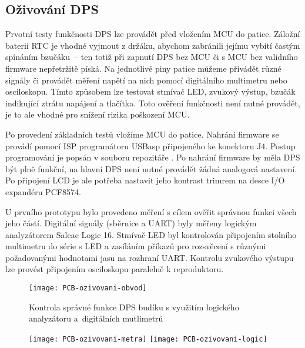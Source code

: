 \subsection{Oživování DPS}
Prvotní testy funkčnosti DPS lze provádět před vložením MCU do patice. Záložní
baterii RTC je vhodné vyjmout z držáku, abychom zabránili jejímu vybití častým
spínáním bzučáku~-- ten totiž při zapnutí DPS bez MCU či s MCU bez validního
firmware nepřetržitě píská. Na jednotlivé piny patice můžeme přivádět různé
signály či provádět měření napětí na nich pomocí digitálního multimetru nebo
osciloskopu. Tímto způsobem lze testovat stmívač LED, zvukový výstup, bzučák
indikující ztrátu napájení a tlačítka. Toto ověření funkčnosti není nutné
provádět, je to ale vhodné pro snížení rizika poškození MCU.

Po provedení základních testů vložíme MCU do patice. Nahrání firmware se
provádí pomocí ISP programátoru USBasp připojeného ke konektoru J4. Postup
programování je popsán v souboru  repozitáře
. Po nahrání firmware by měla DPS být plně funkční, na
hlavní DPS není nutné provádět žádná analogová nastavení. Po připojení LCD je
ale potřeba nastavit jeho kontrast trimrem na desce I/O expandéru PCF8574.

U prvního prototypu bylo provedeno měření s cílem ověřit správnou funkci všech
jeho částí. Digitální signály (sběrnice \IIC{} a UART) byly měřeny logickým
analyzátorem Saleae Logic 16. Stmívač LED byl kontrolován připojením stolního
multimetru do série s LED a zasíláním příkazů pro rozsvěcení s různými
požadovanými hodnotami jasu na rozhraní UART. Kontrolu zvukového výstupu lze
provést připojením osciloskopu paralelně k reproduktoru.

\begin{figure}[htbp]
    \centering
    \texttt{[image: PCB-ozivovani-obvod]}
    \caption{%
        Kontrola správné funkce DPS budíku s využitím logického analyzátoru
        a~digitálních mutlimetrů
    }
    \label{fig:PCB ozivovani logic}
\end{figure}
\begin{figure}\ContinuedFloat
    \centering
    \texttt{[image: PCB-ozivovani-metra]}
    \texttt{[image: PCB-ozivovani-logic]}
\end{figure}
